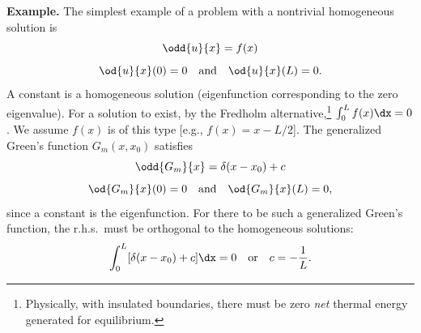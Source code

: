 \textbf{Example.}
The simplest example of a problem with a nontrivial homogeneous solution is
\begin{equation}
\label{eq:9.4.18}
\odd{u}{x} = f(x)
\end{equation}
\begin{equation}
\label{eq:9.4.19}
\od{u}{x}(0) = 0 \quad\text{and}\quad \od{u}{x}(L) = 0.
\end{equation}
A constant is a homogeneous solution (eigenfunction corresponding to the zero eigenvalue).  For a solution to exist, by the Fredholm alternative,\footnote{Physically, with insulated boundaries, there must be zero \emph{net} thermal energy generated for equilibrium.} $\int_0^L f(x)\dx = 0$.  We assume $f(x)$ is of this type [e.g., $f(x) = x - L/2$].  The generalized Green's function $G_m(x,x_0)$ satisfies
\begin{equation}
\label{eq:9.4.20}
\odd{G_m}{x} = \delta(x-x_0) + c
\end{equation}
\begin{equation}
\label{eq:9.4.21}
\od{G_m}{x}(0) = 0 \quad\text{and}\quad \od{G_m}{x}(L) = 0,
\end{equation}
since a constant is the eigenfunction.  For there to be such a generalized Green's function, the r.h.s.\ must be orthogonal to the homogeneous solutions:
\[
\int_0^L [\delta(x-x_0) + c]\dx = 0 \quad\text{or}\quad c = -\frac{1}{L}.
\]

